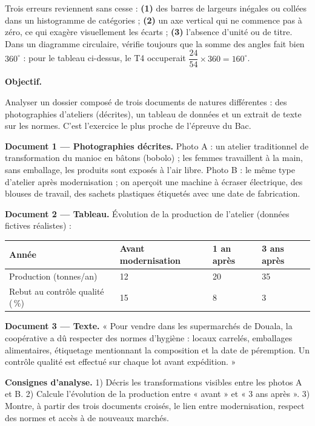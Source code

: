 \documentclass[11pt]{article}
\newcounter{popsec}
\newcounter{popsub}
\newcommand{\courssub}[1]{%
  \stepcounter{popsub}%
  \par\vspace{9pt}\noindent{\popxbold\fontsize{11.5}{13}\selectfont\color{popink}{\color{poporange}\thepopsec.\thepopsub}\hspace{6pt}#1}\par\nopagebreak\vspace{4pt}
}
\begin{document}
\begin{attention}
Trois erreurs reviennent sans cesse : \textbf{(1)} des barres de largeurs inégales ou collées dans un histogramme de catégories ; \textbf{(2)} un axe vertical qui ne commence pas à zéro, ce qui exagère visuellement les écarts ; \textbf{(3)} l'absence d'unité ou de titre. Dans un diagramme circulaire, vérifie toujours que la somme des angles fait bien $360^{\circ}$ : pour le tableau ci-dessus, le T4 occuperait $\dfrac{24}{54} \times 360 = 160^{\circ}$.
\end{attention}

\courssub{TP 4 — Analyser un dossier documentaire}

\textbf{Objectif.}\par Analyser un dossier composé de trois documents de natures différentes : des photographies d'ateliers (décrites), un tableau de données et un extrait de texte sur les normes. C'est l'exercice le plus proche de l'épreuve du Bac.

\begin{experience}
\textbf{Document 1 — Photographies décrites.} Photo A : un atelier traditionnel de transformation du manioc en bâtons (bobolo) ; les femmes travaillent à la main, sans emballage, les produits sont exposés à l'air libre. Photo B : le même type d'atelier après modernisation ; on aperçoit une machine à écraser électrique, des blouses de travail, des sachets plastiques étiquetés avec une date de fabrication.
\medskip

\textbf{Document 2 — Tableau.} Évolution de la production de l'atelier (données fictives réalistes) :
\begin{center}
\begin{tabularx}{\linewidth}{|l|X|X|X|}\hline
\rowcolor{popblueL} \textbf{Année} & Avant modernisation & 1 an après & 3 ans après \\ \hline
Production (tonnes/an) & 12 & 20 & 35 \\ \hline
Rebut au contrôle qualité (\,\%) & 15 & 8 & 3 \\ \hline
\end{tabularx}
\end{center}

\textbf{Document 3 — Texte.} « Pour vendre dans les supermarchés de Douala, la coopérative a dû respecter des normes d'hygiène : locaux carrelés, emballages alimentaires, étiquetage mentionnant la composition et la date de péremption. Un contrôle qualité est effectué sur chaque lot avant expédition. »
\medskip

\textbf{Consignes d'analyse.} 1) Décris les transformations visibles entre les photos A et B. 2) Calcule l'évolution de la production entre « avant » et « 3 ans après ». 3) Montre, à partir des trois documents croisés, le lien entre modernisation, respect des normes et accès à de nouveaux marchés.
\end{experience}
\end{document}
